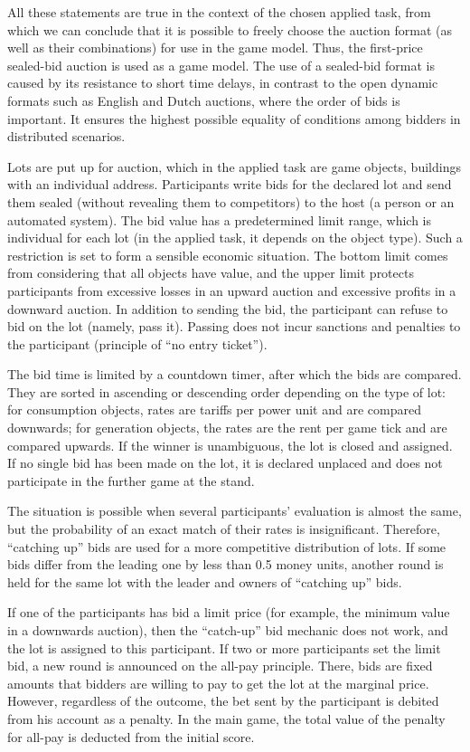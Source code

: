 \documentclass[
]{ceurart}
\begin{document}
All these statements are true in the context of the chosen applied task, from which we can conclude that it is possible to freely choose the auction format (as well as their combinations) for use in the game model. Thus, the first-price sealed-bid auction is used as a game model. The use of a sealed-bid format is caused by its resistance to short time delays, in contrast to the open dynamic formats such as English and Dutch auctions, where the order of bids is important. It ensures the highest possible equality of conditions among bidders in distributed scenarios.

Lots are put up for auction, which in the applied task are game objects, buildings with an individual address. Participants write bids for the declared lot and send them sealed (without revealing them to competitors) to the host (a person or an automated system).
The bid value has a predetermined limit range, which is individual for each lot (in the applied task, it depends on the object type). Such a restriction is set to form a sensible economic situation. The bottom limit comes from considering that all objects have value, and the upper limit protects participants from excessive losses in an upward auction and excessive profits in a downward auction.
In addition to sending the bid, the participant can refuse to bid on the lot (namely, pass it). Passing does not incur sanctions and penalties to the participant (principle of ``no entry ticket'').

The bid time is limited by a countdown timer, after which the bids are compared. They are sorted in ascending or descending order depending on the type of lot: for consumption objects, rates are tariffs per power unit and are compared downwards; for generation objects, the rates are the rent per game tick and are compared upwards. If the winner is unambiguous, the lot is closed and assigned. If no single bid has been made on the lot, it is declared unplaced and does not participate in the further game at the stand.

The situation is possible when several participants’ evaluation is almost the same, but the probability of an exact match of their rates is insignificant. Therefore, ``catching up'' bids are used for a more competitive distribution of lots. If some bids differ from the leading one by less than 0.5 money units, another round is held for the same lot with the leader and owners of ``catching up'' bids.

If one of the participants has bid a limit price (for example, the minimum value in a downwards auction), then the ``catch-up'' bid mechanic does not work, and the lot is assigned to this participant. If two or more participants set the limit bid, a new round is announced on the all-pay principle. There, bids are fixed amounts that bidders are willing to pay to get the lot at the marginal price. However, regardless of the outcome, the bet sent by the participant is debited from his account as a penalty. In the main game, the total value of the penalty for all-pay is deducted from the initial score.
\end{document}
